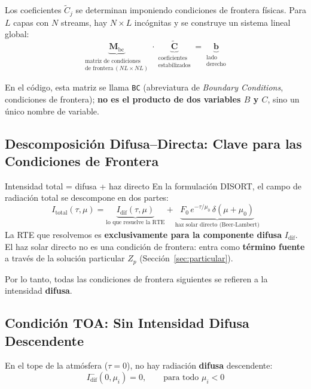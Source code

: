 \documentclass[a4paper,11pt]{article}
\begin{document}
Los coeficientes $\widetilde{C}_j$ se determinan imponiendo condiciones de frontera f\'isicas. Para $L$ capas con $N$ streams, hay $N \times L$ inc\'ognitas y se construye un sistema lineal global:
\begin{equation}
\underbrace{\mathbf{M}_{\text{bc}}}_{\substack{\text{matriz de condiciones}\\\text{de frontera}\,(NL \times NL)}} \cdot \underbrace{\widetilde{\mathbf{C}}}_{\substack{\text{coeficientes}\\\text{estabilizados}}} = \underbrace{\mathbf{b}}_{\substack{\text{lado}\\\text{derecho}}}
\label{eq:bc_system}
\end{equation}

En el c\'odigo, esta matriz se llama \texttt{BC} (abreviatura de \textit{Boundary Conditions}, condiciones de frontera); \textbf{no es el producto de dos variables $B$ y $C$}, sino un \'unico nombre de variable.

\subsection{Descomposici\'on Difusa--Directa: Clave para las Condiciones de Frontera}

\begin{concept}{Intensidad total = difusa + haz directo}
En la formulaci\'on DISORT, el campo de radiaci\'on total se descompone en dos partes:
\begin{equation}
I_{\text{total}}(\tau, \mu) = \underbrace{I_{\text{dif}}(\tau, \mu)}_{\text{lo que resuelve la RTE}} + \underbrace{F_0 \, e^{-\tau/\mu_0} \, \delta(\mu + \mu_0)}_{\text{haz solar directo (Beer-Lambert)}}
\end{equation}
La RTE que resolvemos es \textbf{exclusivamente para la componente difusa} $I_{\text{dif}}$.  El haz solar directo no es una condici\'on de frontera: entra como \textbf{t\'ermino fuente} a trav\'es de la soluci\'on particular $Z_p$ (Secci\'on~\ref{sec:particular}).

Por lo tanto, todas las condiciones de frontera siguientes se refieren a la intensidad \textbf{difusa}.
\end{concept}

\subsection{Condici\'on TOA: Sin Intensidad Difusa Descendente}

En el tope de la atm\'osfera ($\tau = 0$), no hay radiaci\'on \textbf{difusa} descendente:
\begin{equation}
I_{\text{dif}}^{-}(0, \mu_i) = 0, \qquad \text{para todo } \mu_i < 0
\label{eq:bc_toa}
\end{equation}
\end{document}
